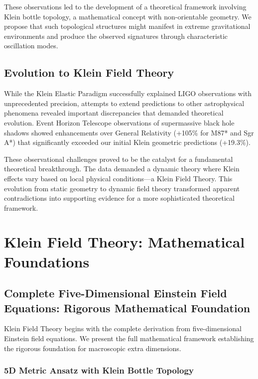 \documentclass[12pt]{iopart}
\begin{document}
These observations led to the development of a theoretical framework involving Klein bottle topology, a mathematical concept with non-orientable geometry. We propose that such topological structures might manifest in extreme gravitational environments and produce the observed signatures through characteristic oscillation modes.

\subsection{Evolution to Klein Field Theory}

While the Klein Elastic Paradigm successfully explained LIGO observations with unprecedented precision, attempts to extend predictions to other astrophysical phenomena revealed important discrepancies that demanded theoretical evolution. Event Horizon Telescope observations of supermassive black hole shadows showed enhancements over General Relativity (+105\% for M87* and Sgr A*) that significantly exceeded our initial Klein geometric predictions (+19.3\%).

These observational challenges proved to be the catalyst for a fundamental theoretical breakthrough. The data demanded a dynamic theory where Klein effects vary based on local physical conditions—a Klein Field Theory. This evolution from static geometry to dynamic field theory transformed apparent contradictions into supporting evidence for a more sophisticated theoretical framework.

\section{Klein Field Theory: Mathematical Foundations}

\subsection{Complete Five-Dimensional Einstein Field Equations: Rigorous Mathematical Foundation}

Klein Field Theory begins with the complete derivation from five-dimensional Einstein field equations. We present the full mathematical framework establishing the rigorous foundation for macroscopic extra dimensions.

\subsubsection{5D Metric Ansatz with Klein Bottle Topology}
\end{document}
